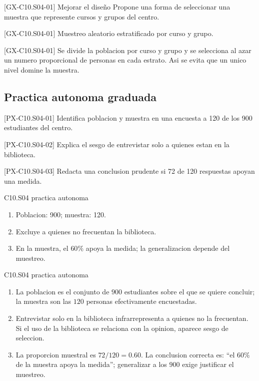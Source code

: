 \begin{guidedexercise}{[GX-C10.S04-01] Mejorar el diseño}
Propone una forma de seleccionar una muestra que represente cursos y grupos del centro.
\end{guidedexercise}
\begin{shortanswer}{[GX-C10.S04-01]} Muestreo aleatorio estratificado por curso y grupo. \end{shortanswer}
\begin{fullsolution}{[GX-C10.S04-01]}
Se divide la poblacion por curso y grupo y se selecciona al azar un numero proporcional de
personas en cada estrato. Asi se evita que un unico nivel domine la muestra.
\end{fullsolution}

\subsection*{Practica autonoma graduada}
\begin{exercise}{[PX-C10.S04-01] Identifica poblacion y muestra en una encuesta a 120 de los 900 estudiantes del centro.}\end{exercise}
\begin{exercise}{[PX-C10.S04-02] Explica el sesgo de entrevistar solo a quienes estan en la biblioteca.}\end{exercise}
\begin{exercise}{[PX-C10.S04-03] Redacta una conclusion prudente si 72 de 120 respuestas apoyan una medida.}\end{exercise}
\begin{shortanswer}{C10.S04 practica autonoma}
\begin{enumerate}
  \item Poblacion: 900; muestra: 120.
  \item Excluye a quienes no frecuentan la biblioteca.
  \item En la muestra, el \(60\%\) apoya la medida; la generalizacion depende del muestreo.
\end{enumerate}
\end{shortanswer}
\begin{fullsolution}{C10.S04 practica autonoma}
\begin{enumerate}
  \item La poblacion es el conjunto de \(900\) estudiantes sobre el que se quiere concluir; la
  muestra son las \(120\) personas efectivamente encuestadas.
  \item Entrevistar solo en la biblioteca infrarrepresenta a quienes no la frecuentan. Si el uso
  de la biblioteca se relaciona con la opinion, aparece sesgo de seleccion.
  \item La proporcion muestral es \(72/120=0.60\). La conclusion correcta es: ``el \(60\%\) de
  la muestra apoya la medida''; generalizar a los \(900\) exige justificar el muestreo.
\end{enumerate}
\end{fullsolution}

